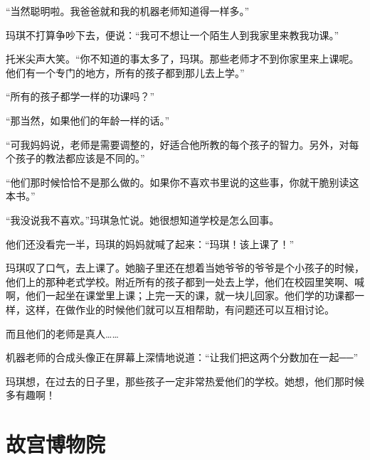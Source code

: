 \documentclass[12pt,UTF-8,openany]{ctexbook}
\begin{document}
\begin{large}
    “当然聪明啦。我爸爸就和我的机器老师知道得一样多。”
    
    玛琪不打算争吵下去，便说：“我可不想让一个陌生人到我家里来教我功课。”
    
    托米尖声大笑。“你不知道的事太多了，玛琪。那些老师才不到你家里来上课呢。他们有一个专门的地方，所有的孩子都到那儿去上学。”
    
    “所有的孩子都学一样的功课吗？”
    
    “那当然，如果他们的年龄一样的话。”
    
    “可我妈妈说，老师是需要调整的，好适合他所教的每个孩子的智力。另外，对每个孩子的教法都应该是不同的。”
    
    “他们那时候恰恰不是那么做的。如果你不喜欢书里说的这些事，你就干脆别读这本书。”
    
    “我没说我不喜欢。”玛琪急忙说。她很想知道学校是怎么回事。
    
    他们还没看完一半，玛琪的妈妈就喊了起来：“玛琪！该上课了！”
    
    玛琪叹了口气，去上课了。她脑子里还在想着当她爷爷的爷爷是个小孩子的时候，他们上的那种老式学校。附近所有的孩子都到一处去上学，他们在校园里笑啊、喊啊，他们一起坐在课堂里上课；上完一天的课，就一块儿回家。他们学的功课都一样，这样，在做作业的时候他们就可以互相帮助，有问题还可以互相讨论。
    
    而且他们的老师是真人……
    
    机器老师的合成头像正在屏幕上深情地说道：“让我们把这两个分数加在一起──”
    
    玛琪想，在过去的日子里，那些孩子一定非常热爱他们的学校。她想，他们那时候多有趣啊！
    
\end{large}



\chapter{故宫博物院}
\end{document}
